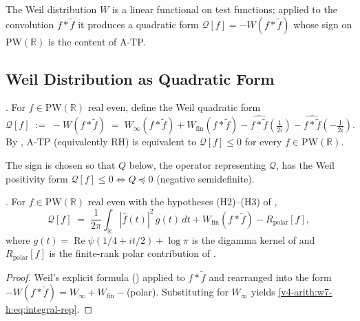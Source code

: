 The Weil distribution \(W\) is a linear functional on test functions;
applied to the convolution \(f*\widetilde{f}\) it produces a quadratic
form \(\mathcal{Q}[f]=-W(f*\widetilde{f})\) whose sign on
\(\mathrm{PW}(\mathbb{R})\) is the content of A-TP.

\subsection{Weil Distribution as Quadratic Form}
\label{v4-arith:w7-h:quadratic-form:weil-as-q}

\begin{definition}
\label{v4-arith:w7-h:def:weil-quadratic}
\ClaimStatusDefinitional. For \(f\in\mathrm{PW}(\mathbb{R})\) real even,
define the Weil quadratic form
\begin{equation}
\label{v4-arith:w7-h:eq:weil-quadratic}
\mathcal{Q}[f]\;:=\;-W(f*\widetilde{f})
\;=\;W_{\infty}(f*\widetilde{f})+W_{\mathrm{fin}}(f*\widetilde{f})-\widehat{f*\widetilde{f}}\!\left(\tfrac{1}{2i}\right)-\widehat{f*\widetilde{f}}\!\left(-\tfrac{1}{2i}\right).
\end{equation}
By , A-TP
(equivalently RH) is equivalent to \(\mathcal{Q}[f]\leq 0\) for every
\(f\in\mathrm{PW}(\mathbb{R})\).
\end{definition}

The sign is chosen so that \(Q\) below, the operator representing
\(\mathcal{Q}\), has the Weil positivity form
\(\mathcal{Q}[f]\leq 0\Leftrightarrow Q\preceq 0\) (negative
semidefinite).

\begin{proposition}
\label{v4-arith:w7-h:prop:integral-rep}
\ClaimStatusProvedHere. For \(f\in\mathrm{PW}(\mathbb{R})\) real even
with the hypotheses (H2)--(H3) of
,
\begin{equation}
\label{v4-arith:w7-h:eq:integral-rep}
\mathcal{Q}[f]
\;=\;\frac{1}{2\pi}\!\int_{\mathbb{R}}|\widehat{f}(t)|^{2}\,g(t)\,dt+W_{\mathrm{fin}}(f*\widetilde{f})-R_{\mathrm{polar}}[f],
\end{equation}
where \(g(t)=\operatorname{Re}\psi(1/4+it/2)+\log\pi\) is the digamma
kernel of  and \(R_{\mathrm{polar}}[f]\) is
the finite-rank polar contribution of
.
\end{proposition}

\begin{proof}
Weil's explicit formula ()
applied to \(f*\widetilde{f}\) and rearranged into the form
\(-W(f*\widetilde{f})=W_{\infty}+W_{\mathrm{fin}}-\)(polar).
Substituting  for \(W_{\infty}\)
yields \eqref{v4-arith:w7-h:eq:integral-rep}.
\end{proof}

